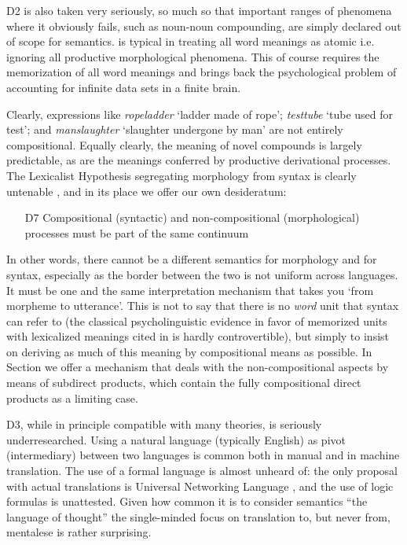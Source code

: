 \documentclass[output=paper,colorlinks=true,citecolor=brown]{langscibook}
\begin{document}
D2 is also taken very seriously, so much so that important
ranges of phenomena where it obviously fails, such as noun-noun compounding,
are simply declared out of scope for semantics. \citet{Fodor:1998} is typical
in treating all word meanings as atomic i.e. ignoring all productive
morphological phenomena. This of course requires the memorization of all word
meanings and brings back the psychological problem
\citep{Partee:1979,Partee:2013} of accounting for infinite data sets in a
finite brain.

Clearly, expressions like \emph{ropeladder} `ladder made of rope'; \emph{testtube} `tube used for test'; and \emph{manslaughter} `slaughter undergone
by man' \citep{Kiparsky:1982b} are not entirely compositional. Equally
clearly, the meaning of novel compounds is largely predictable, as are the
meanings conferred by productive derivational processes. The Lexicalist
Hypothesis \citep{Chomsky:1970} segregating morphology from syntax is clearly
untenable \citep{Bruening:2018}, and in its place we offer our own
desideratum:

\begin{itemize}
\item[D7] 
  Compositional (syntactic) and non-compositional (morphological)
  process\-es must be part of the same continuum
\end{itemize}

In other words, there cannot be a different semantics for morphology and for
syntax, especially as the border between the two is not uniform across
languages. It must be one and the same interpretation mechanism that takes you
`from morpheme to utterance'. This is not to say that there is no \emph{word}
unit that syntax can refer to (the classical psycholinguistic evidence in
favor of memorized units with lexicalized meanings cited in \cite{Muller:2018}
is hardly controvertible), but simply to insist on deriving as much of this
meaning by compositional means as possible. In Section  we offer a
mechanism that deals with the non-compositional aspects by means of subdirect
products, which contain the fully compositional direct products as a limiting
case.

\medskip\noindent D3, while in principle compatible with many theories, is
seriously underresearch\-ed. Using a natural language (typically English) as
pivot (intermediary) between two languages is common both in manual and in
machine translation. The use of a formal language is almost unheard of: the
only proposal with actual translations is Universal Networking Language
\citep{Cardenosa:2005}, and the use of logic formulas is unattested. Given how
common it is to consider semantics ``the language of thought'' the
single-minded focus on translation to, but never from, mentalese is rather
surprising.
\end{document}
